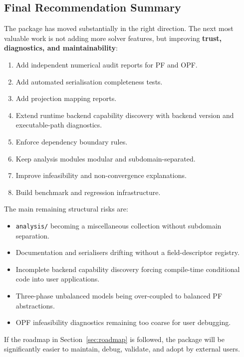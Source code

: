 \subsection{Final Recommendation Summary}
\label{sec:final-recommendation}

The package has moved substantially in the right direction.
The next most valuable work is not adding more solver features,
but improving \textbf{trust, diagnostics, and maintainability}:

\begin{enumerate}
  \item Add independent numerical audit reports for PF and OPF.
  \item Add automated serialisation completeness tests.
  \item Add projection mapping reports.
  \item Extend runtime backend capability discovery with backend version and
        executable-path diagnostics.
  \item Enforce dependency boundary rules.
  \item Keep analysis modules modular and subdomain-separated.
  \item Improve infeasibility and non-convergence explanations.
  \item Build benchmark and regression infrastructure.
\end{enumerate}

The main remaining structural risks are:

\begin{itemize}
  \item \texttt{analysis/} becoming a miscellaneous collection without
        subdomain separation.
  \item Documentation and serialisers drifting without a field-descriptor
        registry.
  \item Incomplete backend capability discovery forcing compile-time
        conditional code into user applications.
  \item Three-phase unbalanced models being over-coupled to balanced PF
        abstractions.
  \item OPF infeasibility diagnostics remaining too coarse for user debugging.
\end{itemize}

If the roadmap in Section~\ref{sec:roadmap} is followed, the package will be
significantly easier to maintain, debug, validate, and adopt by external users.
